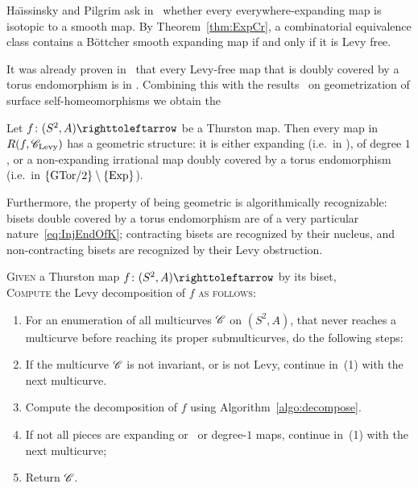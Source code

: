 \documentclass{amsart}
\begin{document}
Ha\"\i ssinsky and Pilgrim ask in~\cite{haissinsky-pilgrim:algebraic}
whether every everywhere-expanding map is isotopic to a smooth map. By
Theorem~\ref{thm:ExpCr}, a combinatorial equivalence class contains a
B\"ottcher smooth expanding map if and only if it is Levy free.

It was already proven in~\cite{selinger-yampolsky:geometrization} that
every Levy-free map that is doubly covered by a torus endomorphism is
in \Tor. Combining this with the
results~\cites{nielsen:surfaces,thurston:surfaces} on geometrization of
surface self-homeomorphisms we obtain the
\begin{cor}
  Let $f\colon(S^2,A)\selfmap$ be a Thurston map. Then every map in
  $R(f,{\mathscr C}_{\text{Levy}})$ has a geometric structure: it is either
  expanding (i.e.\ in \Exp), of degree $1$, or a non-expanding
  irrational map doubly covered by a torus endomorphism (i.e.\ in
  $\{\operatorname{GTor/2}\}\setminus\{\operatorname{Exp}\}$).
\end{cor}
Furthermore, the property of being geometric is algorithmically
recognizable: bisets double covered by a torus endomorphism are of a
very particular nature~\eqref{eq:InjEndOfK}; contracting bisets are recognized by their
nucleus, and non-contracting bisets are recognized by their Levy
obstruction.

\begin{algo}\label{algo:levy}
  \textsc{Given} a Thurston map $f\colon(S^2,A)\selfmap$ by its biset,\\
  \textsc{Compute} the Levy decomposition of $f$ \textsc{as follows:}\\\upshape
  \begin{enumerate}
  \item For an enumeration of all multicurves ${\mathscr C}$ on $(S^2,A)$, that
    never reaches a multicurve before reaching its proper
    submulticurves, do the following steps:
  \item If the multicurve ${\mathscr C}$ is not invariant, or is not Levy,
    continue in~(1) with the next multicurve.
  \item Compute the decomposition of $f$ using
    Algorithm~\ref{algo:decompose}.
  \item If not all pieces are expanding or \Tor\ or degree-$1$ maps,
    continue in~(1) with the next multicurve;
  \item Return ${\mathscr C}$.
  \end{enumerate}
\end{algo}
\end{document}
